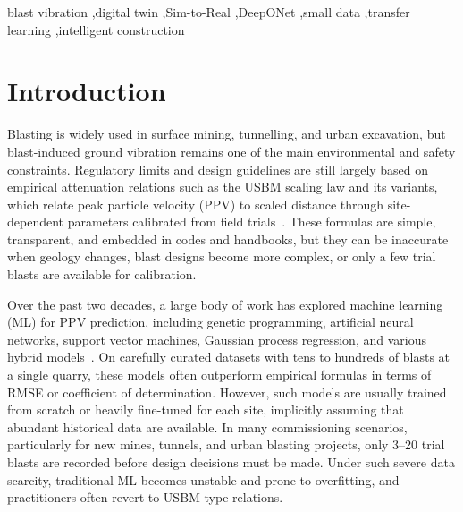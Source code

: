 \documentclass[a4paper,fleqn]{cas-sc}
\begin{document}
\begin{keywords}
blast vibration \sep digital twin \sep Sim-to-Real \sep DeepONet \sep small data \sep transfer learning \sep intelligent construction
\end{keywords}

\maketitle

\section{Introduction}

Blasting is widely used in surface mining, tunnelling, and urban excavation,
but blast-induced ground vibration remains one of the main environmental and safety constraints.
Regulatory limits and design guidelines are still largely based on empirical attenuation relations such as the USBM scaling law
and its variants, which relate peak particle velocity (PPV) to scaled distance through site-dependent parameters calibrated from field trials~\citep{Duvall1962,Nicholls1971,Siskind1980}.
These formulas are simple, transparent, and embedded in codes and handbooks,
but they can be inaccurate when geology changes, blast designs become more complex,
or only a few trial blasts are available for calibration.

Over the past two decades, a large body of work has explored machine learning (ML) for PPV prediction,
including genetic programming, artificial neural networks, support vector machines,
Gaussian process regression, and various hybrid models~\citep{Dindarloo2015GP,Faradonbeh2017Hybrid,Mohammadnejad2012SVM,Arthur2022GPR,Keshtegar2023RSMSVR,Nguyen2019EvoPPV}.
On carefully curated datasets with tens to hundreds of blasts at a single quarry,
these models often outperform empirical formulas in terms of RMSE or coefficient of determination.
However, such models are usually trained from scratch or heavily fine-tuned for each site,
implicitly assuming that abundant historical data are available.
In many commissioning scenarios, particularly for new mines, tunnels, and urban blasting projects,
only 3--20 trial blasts are recorded before design decisions must be made.
Under such severe data scarcity, traditional ML becomes unstable and prone to overfitting,
and practitioners often revert to USBM-type relations.
\end{document}
